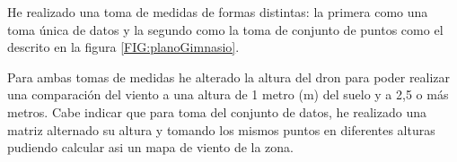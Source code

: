 

He realizado una toma de medidas de formas distintas: la primera como una toma única de datos y la segundo como la toma de conjunto de puntos como el descrito en la figura \ref{FIG:planoGimnasio}.

Para ambas tomas de medidas he alterado la altura del dron para poder realizar una comparación del viento a una altura de 1 metro (m) del suelo y a 2,5 o más metros. Cabe indicar que para toma del conjunto de datos, he realizado una matriz alternado su altura y tomando los mismos puntos en diferentes alturas pudiendo calcular asi un mapa de viento de la zona.